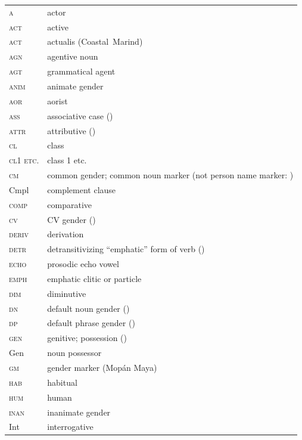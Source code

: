 \documentclass[output=collectionpaper]{langsci/langscibook}
\begin{document}
 
\begin{tabularx}{.48\textwidth}{lQ} 
\scshape a	 & 	actor\\
\scshape act	 & 	active\\
\scshape act	 & 	actualis ({Coastal~Marind})\\
\scshape agn	 & 	agentive noun\\
\scshape agt	 & 	grammatical agent\\
\scshape anim	 & 	animate gender\\
\scshape aor	 & 	aorist\\
\scshape ass	 & 	associative case ()\\
\scshape attr	 & 	attributive ()\\
\scshape cl	 & 	class\\
\scshape cl1 \normalfont etc.	 & 	class 1 etc.\\
\scshape cm	 & 	common gender; common  noun marker (not person    name marker: )\\
\normalfont Cmpl	 & 	complement clause\\
\scshape comp	 & 	comparative\\
\scshape cv	 & 	CV gender ()\\
\scshape deriv	 & 	derivation\\
\scshape detr	 & 	detransitivizing ``emphatic'' form of verb   ()\\
\scshape echo	 & 	prosodic echo vowel\\
\scshape emph	 & 	emphatic clitic or particle\\
\scshape dim	 & 	diminutive\\
\scshape dn	 & 	default noun gender  ()\\
\scshape dp	 & 	default phrase gender   ()\\
\scshape gen	 & 	genitive; possession   ()\\
\normalfont Gen	 & 	noun possessor\\
\scshape gm	 & 	gender marker  (Mopán Maya)\\
\scshape hab	 & 	habitual\\
\scshape hum	 & 	human\\
\scshape inan	 & 	inanimate gender\\
Int	 & 	interrogative\\
\end{tabularx}
\end{document}
